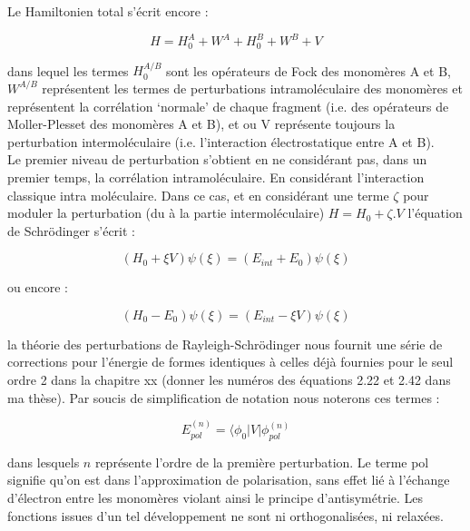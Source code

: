    Le Hamiltonien total s'écrit encore :
   
   \begin{equation}
   H = H_{0}^{A} + W^{A} + H_{0}^{B} + W^{B} + V
   \end{equation}
   
   dans lequel les termes $H_{0}^{A/B}$ sont les opérateurs de Fock des monomères A et B, $W^{A/B}$ représentent les termes de perturbations intramoléculaire des monomères et représentent la corrélation ‘normale’ de chaque fragment (i.e. des opérateurs de Moller-Plesset des monomères A et B), et ou V représente toujours la perturbation intermoléculaire (i.e. l’interaction électrostatique entre A et B).\\
   
   Le premier niveau de perturbation s’obtient en ne considérant pas, dans un premier temps, la corrélation intramoléculaire.  
   En considérant l’interaction classique intra moléculaire.
   Dans ce cas, et en considérant une terme $\zeta$ pour moduler la perturbation (du à la partie intermoléculaire)
   $H = H_0 + \zeta.V$ l’équation de Schr\"{o}dinger s’écrit :
   
   \begin{equation}
   (H_{0} + \xi V) \psi (\xi) = (E_{int} + E_{0}) \psi (\xi)
   \end{equation}
   
   ou encore :
   
   \begin{equation}
   (H_{0} - E_{0}) \psi (\xi) = (E_{int} - \xi V) \psi (\xi)
   \end{equation}
   
   la théorie des perturbations de Rayleigh-Schr\"{o}dinger nous fournit une série de corrections pour l’énergie \cite{chipman1973perturbation}
   de formes identiques à celles déjà fournies pour le seul ordre 2 dans la chapitre xx (donner les numéros des équations 2.22 et 2.42 dans ma thèse). Par soucis de simplification de notation nous noterons ces termes :
   
   \begin{equation}
   E_{pol}^{(n)} = \langle \phi_{0}|V| \phi_{pol}^{(n)}
   \end{equation}
   
   dans lesquels $n$ représente l’ordre de la première perturbation. 
   Le terme \og pol \fg{} signifie qu’on est dans l'approximation de polarisation, sans effet lié à l’échange d’électron entre les monomères violant ainsi le principe d’antisymétrie. Les fonctions issues d’un tel développement ne sont ni orthogonalisées, ni relaxées.\\
   
